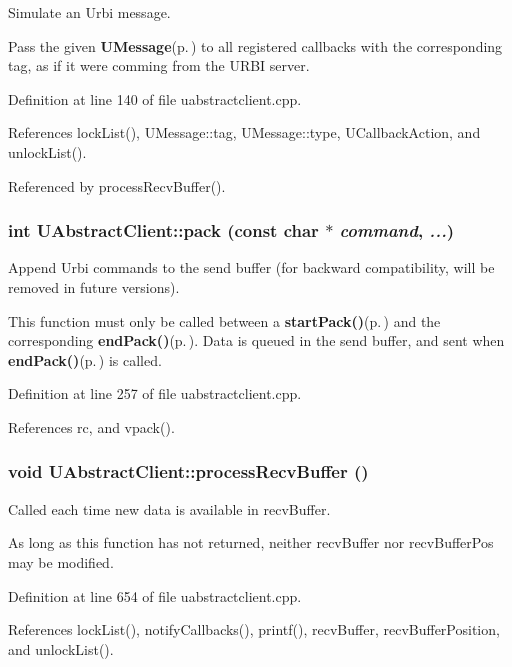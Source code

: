 Simulate an Urbi message. 

Pass the given {\bf UMessage}{\rm (p.\,\pageref{classUMessage})} to all registered callbacks with the corresponding tag, as if it were comming from the URBI server. 

Definition at line 140 of file uabstractclient.cpp.

References lock\-List(), UMessage::tag, UMessage::type, UCallback\-Action, and unlock\-List().

Referenced by process\-Recv\-Buffer().
\subsubsection{\setlength{\rightskip}{0pt plus 5cm}int UAbstract\-Client::pack (const char $\ast$ {\em command},  {\em ...})}\label{classUAbstractClient_a9}


Append Urbi commands to the send buffer (for backward compatibility, will be removed in future versions). 

This function must only be called between a {\bf start\-Pack()}{\rm (p.\,\pageref{classUAbstractClient_a7})} and the corresponding {\bf end\-Pack()}{\rm (p.\,\pageref{classUAbstractClient_a8})}. Data is queued in the send buffer, and sent when {\bf end\-Pack()}{\rm (p.\,\pageref{classUAbstractClient_a8})} is called. 

Definition at line 257 of file uabstractclient.cpp.

References rc, and vpack().
\subsubsection{\setlength{\rightskip}{0pt plus 5cm}void UAbstract\-Client::process\-Recv\-Buffer ()\hspace{0.3cm}{\tt  [protected]}}\label{classUAbstractClient_b0}


Called each time new data is available in recv\-Buffer. 

As long as this function has not returned, neither recv\-Buffer nor recv\-Buffer\-Pos may be modified. 

Definition at line 654 of file uabstractclient.cpp.

References lock\-List(), notify\-Callbacks(), printf(), recv\-Buffer, recv\-Buffer\-Position, and unlock\-List().

